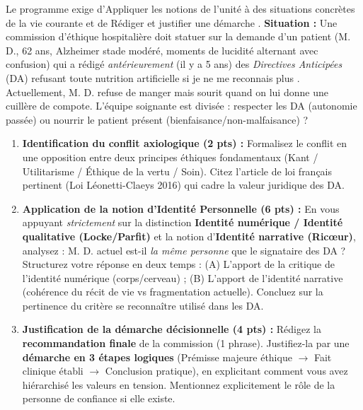 \documentclass[11pt]{article}
\begin{document}
\begin{exercice}
Le programme exige d'\og Appliquer les notions de l'unité à des situations concrètes de la vie courante \fg et de \og Rédiger et justifier une démarche \fg. 
\textbf{Situation :} Une commission d'éthique hospitalière doit statuer sur la demande d'un patient (M. D., 62 ans, Alzheimer stade modéré, moments de lucidité alternant avec confusion) qui a rédigé \textit{antérieurement} (il y a 5 ans) des \textit{Directives Anticipées} (DA) refusant toute nutrition artificielle \og si je ne me reconnais plus \fg. Actuellement, M. D. refuse de manger mais sourit quand on lui donne une cuillère de compote. L'équipe soignante est divisée : respecter les DA (autonomie passée) ou nourrir le patient présent (bienfaisance/non-malfaisance) ?

\begin{enumerate}
    \item \textbf{Identification du conflit axiologique (2 pts) :} Formalisez le conflit en une opposition entre deux principes éthiques fondamentaux (Kant / Utilitarisme / Éthique de la vertu / Soin). Citez l'article de loi français pertinent (Loi Léonetti-Claeys 2016) qui cadre la valeur juridique des DA.
    \item \textbf{Application de la notion d'Identité Personnelle (6 pts) :} En vous appuyant \textit{strictement} sur la distinction \textbf{Identité numérique / Identité qualitative (Locke/Parfit)} et la notion d'\textbf{Identité narrative (Ricœur)}, analysez : M. D. \og actuel \fg est-il \textit{la même personne} que le signataire des DA ? Structurez votre réponse en deux temps : (A) L'apport de la critique de l'identité numérique (corps/cerveau) ; (B) L'apport de l'identité narrative (cohérence du récit de vie vs fragmentation actuelle). Concluez sur la pertinence du critère \og se reconnaître \fg utilisé dans les DA.
    \item \textbf{Justification de la démarche décisionnelle (4 pts) :} Rédigez la \textbf{recommandation finale} de la commission (1 phrase). Justifiez-la par une \textbf{démarche en 3 étapes logiques} (Prémisse majeure éthique $\rightarrow$ Fait clinique établi $\rightarrow$ Conclusion pratique), en explicitant comment vous avez hiérarchisé les valeurs en tension. Mentionnez explicitement le rôle de la \og personne de confiance \fg si elle existe.
\end{enumerate}
\end{exercice}
\end{document}
